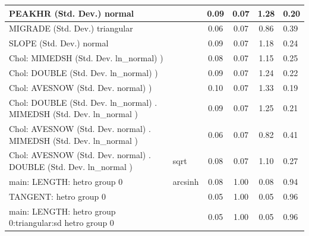 \begin{table}
\begin{center}
\begin{tabular}{|l|l|c|c|c|l|}
			\hline
			PEAKHR (Std. Dev.) normal &  & 0.09 & 0.07 & 1.28 & 0.20 \\
			\hline
			MIGRADE (Std. Dev.) triangular &  & 0.06 & 0.07 & 0.86 & 0.39 \\
			\hline
			SLOPE (Std. Dev.) normal &  & 0.09 & 0.07 & 1.18 & 0.24 \\
			\hline
			 Chol: MIMEDSH (Std. Dev. ln_normal) ) &  & 0.08 & 0.07 & 1.15 & 0.25 \\
			\hline
			 Chol: DOUBLE (Std. Dev. ln_normal) ) &  & 0.09 & 0.07 & 1.24 & 0.22 \\
			\hline
			 Chol: AVESNOW (Std. Dev. normal) ) &  & 0.10 & 0.07 & 1.33 & 0.19 \\
			\hline
			 Chol: DOUBLE (Std. Dev. ln_normal) . MIMEDSH (Std. Dev.   ln_normal ) &  & 0.09 & 0.07 & 1.25 & 0.21 \\
			\hline
			 Chol: AVESNOW (Std. Dev. normal) . MIMEDSH (Std. Dev.   ln_normal ) &  & 0.06 & 0.07 & 0.82 & 0.41 \\
			\hline
			 Chol: AVESNOW (Std. Dev. normal) . DOUBLE (Std. Dev.   ln_normal ) & sqrt & 0.08 & 0.07 & 1.10 & 0.27 \\
			\hline
			main: LENGTH: hetro group 0 & arcsinh & 0.08 & 1.00 & 0.08 & 0.94 \\
			\hline
			TANGENT: hetro group 0 &  & 0.05 & 1.00 & 0.05 & 0.96 \\
			\hline
			main: LENGTH: hetro group 0:triangular:sd  hetro group 0 &  & 0.05 & 1.00 & 0.05 & 0.96 \\
			\hline
		\end{tabular}
	\end{center}
\end{table}